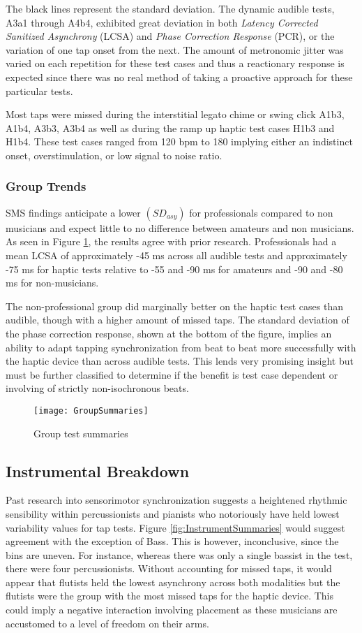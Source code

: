 The black lines represent the standard deviation. The dynamic audible tests, A3a1 through A4b4, exhibited great deviation in both \textit{Latency Corrected Sanitized Asynchrony} (LCSA) and \textit{Phase Correction Response} (PCR), or the variation of one tap onset from the next.  The amount of metronomic jitter was varied on each repetition for these test cases and thus a reactionary response is expected since there was no real method of taking a proactive approach for these particular tests.

Most taps were missed during the interstitial legato chime or swing click A1b3, A1b4, A3b3, A3b4 as well as during the ramp up haptic test cases H1b3 and H1b4. These test cases ranged from 120 bpm to 180 implying either an indistinct onset, overstimulation, or low signal to noise ratio.

\subsubsection{Group Trends}
SMS findings anticipate a lower $(SD_{asy})$ for professionals compared to non musicians and expect little to no difference between amateurs and non musicians. As seen in Figure \ref{fig:GroupSummaries}, the results agree with prior research. Professionals had a mean LCSA of approximately -45 ms across all audible tests and approximately -75 ms for haptic tests relative to -55 and -90 ms for amateurs and -90 and -80 ms for non-musicians.

The non-professional group did marginally better on the haptic test cases than audible, though with a higher amount of missed taps. The standard deviation of the phase correction response, shown at the bottom of the figure, implies an ability to adapt tapping synchronization from beat to beat more successfully with the haptic device than across audible tests. This lends very promising insight but must be further classified to determine if the benefit is test case dependent or involving of strictly non-isochronous beats.
\begin{figure}[H]
    \centering
    \texttt{[image: GroupSummaries]}
    \caption{Group test summaries}
    \label{fig:GroupSummaries}
\end{figure}
\subsection{Instrumental Breakdown}

Past research into sensorimotor synchronization suggests a heightened rhythmic sensibility within percussionists and pianists who notoriously have held lowest variability values for tap tests. Figure \ref{fig:InstrumentSummaries} would suggest agreement with the exception of Bass. This is however, inconclusive, since the bins are uneven. For instance, whereas there was only a single bassist in the test, there were four percussionists. Without accounting for missed taps, it would appear that flutists held the lowest asynchrony across both modalities but the flutists were the group with the most missed taps for the haptic device. This could imply a negative interaction involving placement as these musicians are accustomed to a level of freedom on their arms.

